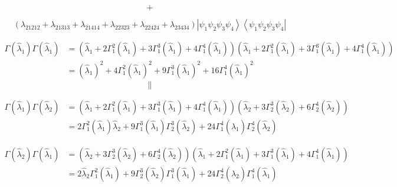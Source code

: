 \documentclass[aps,preprint]{revtex4}%
\begin{document}
\begin{equation}
+
\end{equation}
%

\begin{equation}
\left(  \lambda_{21212}+\lambda_{21313}+\lambda_{21414}+\lambda_{22323}%
+\lambda_{22424}+\lambda_{23434}\right)  \left\vert \psi_{1}\psi_{2}\psi
_{3}\psi_{4}\right\rangle \left\langle \psi_{1}\psi_{2}\psi_{3}\psi
_{4}\right\vert
\end{equation}


\bigskip%

\begin{align}
\Gamma\left(  \hat{\lambda}_{1}\right)  \Gamma\left(  \hat{\lambda}%
_{1}\right)    & =\left(  \hat{\lambda}_{1}+2\Gamma_{1}^{2}\left(
\hat{\lambda}_{1}\right)  +3\Gamma_{1}^{3}\left(  \hat{\lambda}_{1}\right)
+4\Gamma_{1}^{4}\left(  \hat{\lambda}_{1}\right)  \right)  \left(
\hat{\lambda}_{1}+2\Gamma_{1}^{2}\left(  \hat{\lambda}_{1}\right)
+3\Gamma_{1}^{3}\left(  \hat{\lambda}_{1}\right)  +4\Gamma_{1}^{4}\left(
\hat{\lambda}_{1}\right)  \right)  \nonumber\\
& =\left(  \hat{\lambda}_{1}\right)  ^{2}+4\Gamma_{1}^{2}\left(  \hat{\lambda
}_{1}\right)  ^{2}+9\Gamma_{1}^{3}\left(  \hat{\lambda}_{1}\right)
^{2}+16\Gamma_{1}^{4}\left(  \hat{\lambda}_{1}\right)  ^{2}%
\end{align}%
\[
\parallel
\]


\bigskip%

\begin{align}
\Gamma\left(  \hat{\lambda}_{1}\right)  \Gamma\left(  \hat{\lambda}%
_{2}\right)    & =\left(  \hat{\lambda}_{1}+2\Gamma_{1}^{2}\left(
\hat{\lambda}_{1}\right)  +3\Gamma_{1}^{3}\left(  \hat{\lambda}_{1}\right)
+4\Gamma_{1}^{4}\left(  \hat{\lambda}_{1}\right)  \right)  \left(
\hat{\lambda}_{2}+3\Gamma_{2}^{3}\left(  \hat{\lambda}_{2}\right)
+6\Gamma_{2}^{4}\left(  \hat{\lambda}_{2}\right)  \right)  \nonumber\\
& =2\Gamma_{1}^{2}\left(  \hat{\lambda}_{1}\right)  \hat{\lambda}_{2}%
+9\Gamma_{1}^{3}\left(  \hat{\lambda}_{1}\right)  \Gamma_{2}^{3}\left(
\hat{\lambda}_{2}\right)  +24\Gamma_{1}^{4}\left(  \hat{\lambda}_{1}\right)
\Gamma_{2}^{4}\left(  \hat{\lambda}_{2}\right)
\end{align}


\bigskip%

\begin{align}
\Gamma\left(  \hat{\lambda}_{2}\right)  \Gamma\left(  \hat{\lambda}%
_{1}\right)    & =\left(  \hat{\lambda}_{2}+3\Gamma_{2}^{3}\left(
\hat{\lambda}_{2}\right)  +6\Gamma_{2}^{4}\left(  \hat{\lambda}_{2}\right)
\right)  \left(  \hat{\lambda}_{1}+2\Gamma_{1}^{2}\left(  \hat{\lambda}%
_{1}\right)  +3\Gamma_{1}^{3}\left(  \hat{\lambda}_{1}\right)  +4\Gamma
_{1}^{4}\left(  \hat{\lambda}_{1}\right)  \right)  \nonumber\\
& =2\hat{\lambda}_{2}\Gamma_{1}^{2}\left(  \hat{\lambda}_{1}\right)
+9\Gamma_{2}^{3}\left(  \hat{\lambda}_{2}\right)  \Gamma_{1}^{3}\left(
\hat{\lambda}_{1}\right)  +24\Gamma_{2}^{4}\left(  \hat{\lambda}_{2}\right)
\Gamma_{1}^{4}\left(  \hat{\lambda}_{1}\right)
\end{align}
\end{document}
